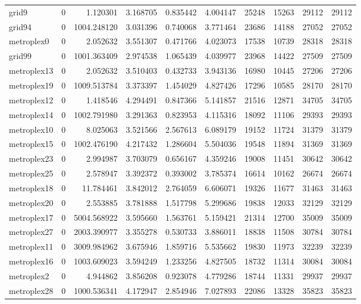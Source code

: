 \begin{longtable}{|l|r|r|r|r|r|r|r|r|r|}
grid9 & 0 & 1.120301 & 3.168705 & 0.835442 & 4.004147 & 25248 & 15263 & 29112 & 29112 \\
grid94 & 0 & 1004.248120 & 3.031396 & 0.740068 & 3.771464 & 23686 & 14188 & 27052 & 27052 \\
metroplex0 & 0 & 2.052632 & 3.551307 & 0.471766 & 4.023073 & 17538 & 10739 & 28318 & 28318 \\
grid99 & 0 & 1001.363409 & 2.974538 & 1.065439 & 4.039977 & 23968 & 14422 & 27509 & 27509 \\
metroplex13 & 0 & 2.052632 & 3.510403 & 0.432733 & 3.943136 & 16980 & 10445 & 27206 & 27206 \\
metroplex19 & 0 & 1009.513784 & 3.373397 & 1.454029 & 4.827426 & 17296 & 10585 & 28170 & 28170 \\
metroplex12 & 0 & 1.418546 & 4.294491 & 0.847366 & 5.141857 & 21516 & 12871 & 34705 & 34705 \\
metroplex14 & 0 & 1002.791980 & 3.291363 & 0.823953 & 4.115316 & 18092 & 11106 & 29393 & 29393 \\
metroplex10 & 0 & 8.025063 & 3.521566 & 2.567613 & 6.089179 & 19152 & 11724 & 31379 & 31379 \\
metroplex15 & 0 & 1002.476190 & 4.217432 & 1.286604 & 5.504036 & 19548 & 11894 & 31369 & 31369 \\
metroplex23 & 0 & 2.994987 & 3.703079 & 0.656167 & 4.359246 & 19008 & 11451 & 30642 & 30642 \\
metroplex25 & 0 & 2.578947 & 3.392372 & 0.393002 & 3.785374 & 16614 & 10162 & 26674 & 26674 \\
metroplex18 & 0 & 11.784461 & 3.842012 & 2.764059 & 6.606071 & 19326 & 11677 & 31463 & 31463 \\
metroplex20 & 0 & 2.553885 & 3.781888 & 1.517798 & 5.299686 & 19838 & 12033 & 32129 & 32129 \\
metroplex17 & 0 & 5004.568922 & 3.595660 & 1.563761 & 5.159421 & 21314 & 12700 & 35009 & 35009 \\
metroplex27 & 0 & 2003.390977 & 3.355278 & 0.530733 & 3.886011 & 18838 & 11508 & 30784 & 30784 \\
metroplex11 & 0 & 3009.984962 & 3.675946 & 1.859716 & 5.535662 & 19830 & 11973 & 32239 & 32239 \\
metroplex16 & 0 & 1003.609023 & 3.594249 & 1.233256 & 4.827505 & 18732 & 11314 & 30084 & 30084 \\
metroplex2 & 0 & 4.944862 & 3.856208 & 0.923078 & 4.779286 & 18744 & 11331 & 29937 & 29937 \\
metroplex28 & 0 & 1000.536341 & 4.172947 & 2.854946 & 7.027893 & 22086 & 13328 & 35823 & 35823 \\

\end{longtable}
